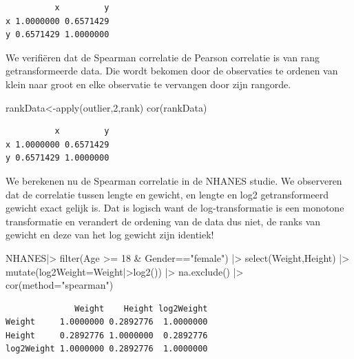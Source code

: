 \documentclass[
  dutch,
  letterpaper,
  12pt]{book}
\newenvironment{Shaded}{\begin{snugshade}}{\end{snugshade}}
\newcommand{\AttributeTok}[1]{\textcolor[rgb]{0.40,0.45,0.13}{#1}}
\newcommand{\DecValTok}[1]{\textcolor[rgb]{0.68,0.00,0.00}{#1}}
\newcommand{\FunctionTok}[1]{\textcolor[rgb]{0.28,0.35,0.67}{#1}}
\newcommand{\NormalTok}[1]{\textcolor[rgb]{0.00,0.23,0.31}{#1}}
\newcommand{\OtherTok}[1]{\textcolor[rgb]{0.00,0.23,0.31}{#1}}
\newcommand{\SpecialCharTok}[1]{\textcolor[rgb]{0.37,0.37,0.37}{#1}}
\newcommand{\StringTok}[1]{\textcolor[rgb]{0.13,0.47,0.30}{#1}}
\theoremstyle{definition}
\theoremstyle{definition}
\theoremstyle{definition}
\theoremstyle{remark}
\begin{document}
\begin{verbatim}
          x         y
x 1.0000000 0.6571429
y 0.6571429 1.0000000
\end{verbatim}

We verifiëren dat de Spearman correlatie de Pearson correlatie is van
rang getransformeerde data. Die wordt bekomen door de observaties te
ordenen van klein naar groot en elke observatie te vervangen door zijn
rangorde.

\begin{Shaded}
\begin{Highlighting}[]
\NormalTok{rankData}\OtherTok{\textless{}{-}}\FunctionTok{apply}\NormalTok{(outlier,}\DecValTok{2}\NormalTok{,rank)}
\FunctionTok{cor}\NormalTok{(rankData)}
\end{Highlighting}
\end{Shaded}

\begin{verbatim}
          x         y
x 1.0000000 0.6571429
y 0.6571429 1.0000000
\end{verbatim}

We berekenen nu de Spearman correlatie in de NHANES studie. We
observeren dat de correlatie tussen lengte en gewicht, en lengte en log2
getransformeerd gewicht exact gelijk is. Dat is logisch want de
log-transformatie is een monotone transformatie en verandert de ordening
van de data dus niet, de ranks van gewicht en deze van het log gewicht
zijn identiek!

\begin{Shaded}
\begin{Highlighting}[]
\NormalTok{NHANES}\SpecialCharTok{|\textgreater{}}
  \FunctionTok{filter}\NormalTok{(Age }\SpecialCharTok{\textgreater{}=} \DecValTok{18} \SpecialCharTok{\&}\NormalTok{ Gender}\SpecialCharTok{==}\StringTok{"female"}\NormalTok{) }\SpecialCharTok{|\textgreater{}}
  \FunctionTok{select}\NormalTok{(Weight,Height) }\SpecialCharTok{|\textgreater{}}
  \FunctionTok{mutate}\NormalTok{(}\AttributeTok{log2Weight=}\NormalTok{Weight}\SpecialCharTok{|\textgreater{}}\FunctionTok{log2}\NormalTok{()) }\SpecialCharTok{|\textgreater{}}
  \FunctionTok{na.exclude}\NormalTok{() }\SpecialCharTok{|\textgreater{}}
  \FunctionTok{cor}\NormalTok{(}\AttributeTok{method=}\StringTok{"spearman"}\NormalTok{)}
\end{Highlighting}
\end{Shaded}

\begin{verbatim}
              Weight    Height log2Weight
Weight     1.0000000 0.2892776  1.0000000
Height     0.2892776 1.0000000  0.2892776
log2Weight 1.0000000 0.2892776  1.0000000
\end{verbatim}
\end{document}
